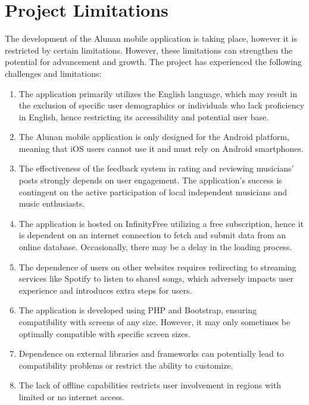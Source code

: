 \clearpage

\section{Project Limitations}
The development of the Alunan mobile application is taking place, however it is restricted by certain limitations. However, these limitations can strengthen the potential for advancement and growth. The project has experienced the following challenges and limitations:
\begin{enumerate}[1.]
    \item The application primarily utilizes the English language, which may result in the exclusion of specific user demographics or individuals who lack proficiency in English, hence restricting its accessibility and potential user base.
    \item The Alunan mobile application is only designed for the Android platform, meaning that iOS users cannot use it and must rely on Android smartphones.
    \item The effectiveness of the feedback system in rating and reviewing musicians' posts strongly depends on user engagement. The application's success is contingent on the active participation of local independent musicians and music enthusiasts.
    \item The application is hosted on InfinityFree utilizing a free subscription, hence it is dependent on an internet connection to fetch and submit data from an online database. Occasionally, there may be a delay in the loading process.
    \item The dependence of users on other websites requires redirecting to streaming services like Spotify to listen to shared songs, which adversely impacts user experience and introduces extra steps for users.
    \item The application is developed using PHP and Bootstrap, ensuring compatibility with screens of any size. However, it may only sometimes be optimally compatible with specific screen sizes.
    \item Dependence on external libraries and frameworks can potentially lead to compatibility problems or restrict the ability to customize.
    \item The lack of offline capabilities restricts user involvement in regions with limited or no internet access.
\end{enumerate}

\clearpage


